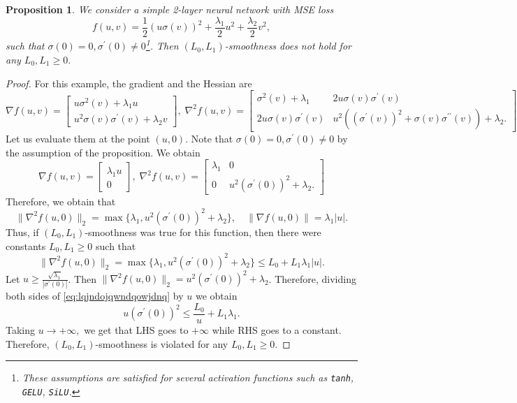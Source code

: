 \documentclass[a4paper,11pt]{article}
\newcommand{\algname}[1]{\texttt{#1}}
\newcommand{\1}{\mathbbm{1}}
\theoremstyle{plain}
\newtheorem{proposition}[theorem]{Proposition}
\begin{document}
\begin{proposition}
\label{prop:counterexample1}
    We consider a simple 2-layer neural network with MSE loss
    \[
    f(u,v) = \frac{1}{2}(u\sigma(v))^2 + \frac{\lambda_1}{2}u^2 + \frac{\lambda_2}{2}v^2,
    \]
    such that $\sigma(0)=0,\sigma^{\prime}(0)\neq 0$\footnote{These assumptions are satisfied for several activation functions such as \algname{tanh}, \algname{GELU}, \algname{SiLU}.}. Then $(L_0, L_1)$-smoothness does not hold for any $L_0, L_1 \ge 0.$
\end{proposition}
\begin{proof}
    For this example, the gradient and the Hessian are
    \[
    \nabla f(u,v) = \begin{bmatrix}
        u\sigma^2(v) + \lambda_1u \\
        u^2\sigma(v)\sigma^{\prime}(v) + \lambda_2v
    \end{bmatrix}, \; 
    \nabla^2 f(u,v) = \begin{bmatrix}
        \sigma^2(v) +\lambda_1 & 2u\sigma(v)\sigma^{\prime}(v) \\
        2u\sigma(v)\sigma^{\prime}(v) & u^2((\sigma^{\prime}(v))^2 + \sigma(v)\sigma^{\prime\prime}(v) ) + \lambda_2.
    \end{bmatrix}
    \]
    Let us evaluate them at the point $(u,0)$. Note that $\sigma(0)=0, \sigma^{\prime}(0)\neq 0$ by the assumption of the proposition. We obtain
    \[
    \nabla f(u,v) = \begin{bmatrix}
        \lambda_1 u\\
        0
    \end{bmatrix}, \; 
    \nabla^2 f(u,v) = \begin{bmatrix}
        \lambda_1 & 0 \\
        0 & u^2(\sigma^{\prime}(0))^2 + \lambda_2.
    \end{bmatrix}
    \]
    Therefore, we obtain that
    \[
    \|\nabla^2f(u,0)\|_2 = \max\{\lambda_1, u^2(\sigma^{\prime}(0))^2 + \lambda_2\}, \quad \|\nabla f(u,0)\|= \lambda_1|u|.
    \]
    Thus, if $(L_0, L_1)$-smoothness was true for this function, then there were constants $L_0, L_1 \ge 0$ such that 
    \begin{equation}\label{eq:lqjndojqwndqowjdnq}
    \|\nabla^2f(u,0)\|_2 =  \max\{\lambda_1, u^2(\sigma^{\prime}(0))^2 + \lambda_2\} \le L_0 + L_1\lambda_1|u|.
    \end{equation}
    Let $u \ge \frac{\sqrt{\lambda_1}}{|\sigma^{\prime}(0)|}$. Then $\|\nabla^2f(u,0)\|_2 = u^2(\sigma^{\prime}(0))^2 + \lambda_2$. Therefore, dividing both sides of \eqref{eq:lqjndojqwndqowjdnq} by $u$ we obtain
    \[
    u(\sigma^{\prime}(0))^2 \le \frac{L_0}{u} + L_1\lambda_1.
    \]
    Taking $u\to +\infty,$ we get that LHS goes to $+\infty$ while RHS goes to a constant. Therefore, $(L_0, L_1)$-smoothness is violated for any $L_0, L_1\ge0.$
\end{proof}
\end{document}
